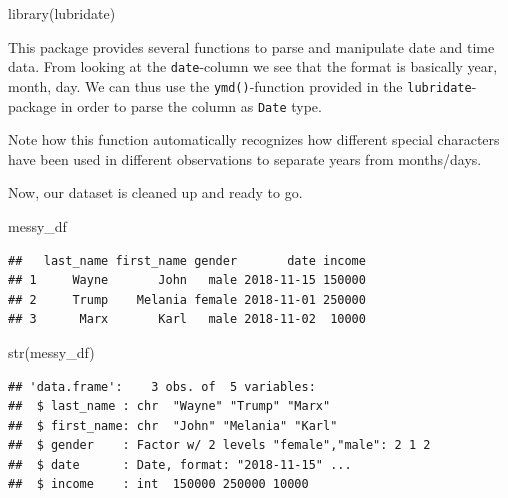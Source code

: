 \documentclass[
  12pt,
]{style/krantz}
\newenvironment{Shaded}{\begin{snugshade}}{\end{snugshade}}
\newcommand{\FunctionTok}[1]{\textcolor[rgb]{0.00,0.00,0.00}{#1}}
\newcommand{\NormalTok}[1]{#1}
\newcommand{\OtherTok}[1]{\textcolor[rgb]{0.56,0.35,0.01}{#1}}
\newcommand{\SpecialCharTok}[1]{\textcolor[rgb]{0.00,0.00,0.00}{#1}}
\begin{document}
\begin{Shaded}
\begin{Highlighting}[]
\FunctionTok{library}\NormalTok{(lubridate)}
\end{Highlighting}
\end{Shaded}

This package provides several functions to parse and manipulate date and time data. From looking at the \texttt{date}-column we see that the format is basically year, month, day. We can thus use the \texttt{ymd()}-function provided in the \texttt{lubridate}-package in order to parse the column as \texttt{Date} type.

\begin{Shaded}
\end{Shaded}

Note how this function automatically recognizes how different special characters have been used in different observations to separate years from months/days.

Now, our dataset is cleaned up and ready to go.

\begin{Shaded}
\begin{Highlighting}[]
\NormalTok{messy\_df}
\end{Highlighting}
\end{Shaded}

\begin{verbatim}
##   last_name first_name gender       date income
## 1     Wayne       John   male 2018-11-15 150000
## 2     Trump    Melania female 2018-11-01 250000
## 3      Marx       Karl   male 2018-11-02  10000
\end{verbatim}

\begin{Shaded}
\begin{Highlighting}[]
\FunctionTok{str}\NormalTok{(messy\_df)}
\end{Highlighting}
\end{Shaded}

\begin{verbatim}
## 'data.frame':    3 obs. of  5 variables:
##  $ last_name : chr  "Wayne" "Trump" "Marx"
##  $ first_name: chr  "John" "Melania" "Karl"
##  $ gender    : Factor w/ 2 levels "female","male": 2 1 2
##  $ date      : Date, format: "2018-11-15" ...
##  $ income    : int  150000 250000 10000
\end{verbatim}
\end{document}
